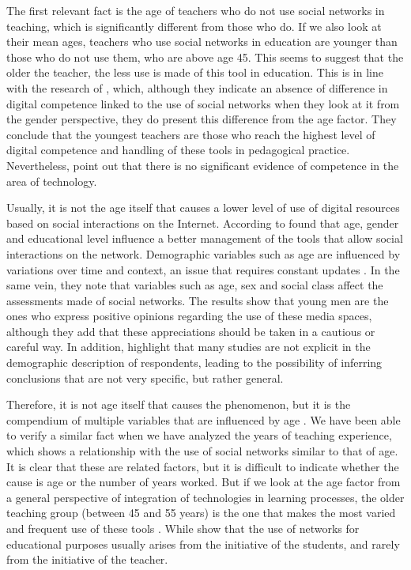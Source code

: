 \documentclass{textolivre}
\begin{document}
The first relevant fact is the age of teachers who do not use social networks in teaching, which is significantly different from those who do. If we also look at their mean ages, teachers who use social networks in education are younger than those who do not use them, who are above age 45. This seems to suggest that the older the teacher, the less use is made of this tool in education. This is in line with the research of \textcite{perez2016}, which, although they indicate an absence of difference in digital competence linked to the use of social networks when they look at it from the gender perspective, they do present this difference from the age factor. They conclude that the youngest teachers are those who reach the highest level of digital competence and handling of these tools in pedagogical practice. Nevertheless, \textcite{suarez2013} point out that there is no significant evidence of competence in the area of technology. 

Usually, it is not the age itself that causes a lower level of use of digital resources based on social interactions on the Internet. According to \textcite{correa2015} found that age, gender and educational level influence a better management of the tools that allow social interactions on the network. Demographic variables such as age are influenced by variations over time and context, an issue that requires constant updates \cite{sanchez2010}. In the same vein, \cite{lopez2020} they note that variables such as age, sex and social class affect the assessments made of social networks. The results show that young men are the ones who express positive opinions regarding the use of these media spaces, although they add that these appreciations should be taken in a cautious or careful way. In addition, \textcite{beemt2020} highlight that many studies are not explicit in the demographic description of respondents, leading to the possibility of inferring conclusions that are not very specific, but rather general.

Therefore, it is not age itself that causes the phenomenon, but it is the compendium of multiple variables that are influenced by age \cite{suarez2013,law2008}. We have been able to verify a similar fact when we have analyzed the years of teaching experience, which shows a relationship with the use of social networks similar to that of age. It is clear that these are related factors, but it is difficult to indicate whether the cause is age or the number of years worked. But if we look at the age factor from a general perspective of integration of technologies in learning processes, the older teaching group (between 45 and 55 years) is the one that makes the most varied and frequent use of these tools \cite{area2016}. While \textcite{gomez2012} show that the use of networks for educational purposes usually arises from the initiative of the students, and rarely from the initiative of the teacher.
\end{document}
